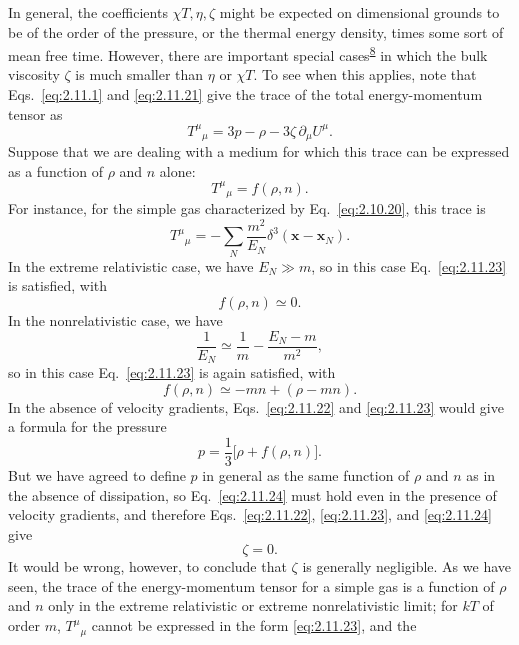 In general, the coefficients \(\chi T,\eta,\zeta\) might be expected on
dimensional grounds to be of the order of the pressure, or the thermal energy
density, times some sort of mean free time. However, there are important special
cases\textsuperscript{\hyperref[ch2-ref-8]{8}} in which the bulk viscosity
\(\zeta\) is much smaller than \(\eta\) or \(\chi T\). To see when this
applies, note that Eqs.~\eqref{eq:2.11.1} and \eqref{eq:2.11.21} give the
trace of the total energy-momentum tensor as
\begin{equation}
  T^\mu{}_\mu=3p-\rho-3\zeta\,\partial_\mu U^\mu .
  \tag{2.11.22}\label{eq:2.11.22}
\end{equation}
Suppose that we are dealing with a medium for which this trace can be expressed
as a function of \(\rho\) and \(n\) alone:
\begin{equation}
  T^\mu{}_\mu=f(\rho,n).
  \tag{2.11.23}\label{eq:2.11.23}
\end{equation}
For instance, for the simple gas characterized by Eq.~\eqref{eq:2.10.20},
this trace is
\[
  T^\mu{}_\mu
  =-\sum_N\frac{m^2}{E_N}\delta^3(\mathbf x-\mathbf x_N).
\]
In the extreme relativistic case, we have \(E_N\gg m\), so in this case
Eq.~\eqref{eq:2.11.23} is satisfied, with
\[
  f(\rho,n)\simeq0 .
\]
In the nonrelativistic case, we have
\[
  \frac1{E_N}\simeq\frac1m-\frac{E_N-m}{m^2},
\]
so in this case Eq.~\eqref{eq:2.11.23} is again satisfied, with
\[
  f(\rho,n)\simeq-mn+(\rho-mn).
\]
In the absence of velocity gradients, Eqs.~\eqref{eq:2.11.22} and
\eqref{eq:2.11.23} would give a formula for the pressure
\begin{equation}
  p=\frac13\bigl[\rho+f(\rho,n)\bigr].
  \tag{2.11.24}\label{eq:2.11.24}
\end{equation}
But we have agreed to define \(p\) in general as the same function of
\(\rho\) and \(n\) as in the absence of dissipation, so
Eq.~\eqref{eq:2.11.24} must hold even in the presence of velocity gradients,
and therefore Eqs.~\eqref{eq:2.11.22}, \eqref{eq:2.11.23}, and
\eqref{eq:2.11.24} give
\begin{equation}
  \zeta=0 .
  \tag{2.11.25}\label{eq:2.11.25}
\end{equation}
It would be wrong, however, to conclude that \(\zeta\) is generally
negligible. As we have seen, the trace of the energy-momentum tensor for a
simple gas is a function of \(\rho\) and \(n\) only in the extreme relativistic
or extreme nonrelativistic limit; for \(kT\) of order \(m\),
\(T^\mu{}_\mu\) cannot be expressed in the form \eqref{eq:2.11.23}, and the
